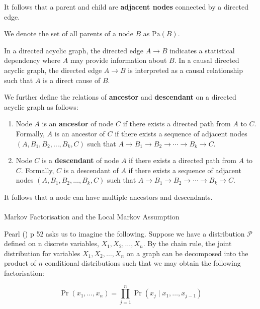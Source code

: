 \documentclass[
  single column]{article}
\makeatletter
\let\oldparagraph\paragraph
\renewcommand{\paragraph}{
    \@ifstar
      \xxxParagraphStar
      \xxxParagraphNoStar
  }
\newcommand{\xxxParagraphStar}[1]{\oldparagraph*{#1}\mbox{}}
\newcommand{\xxxParagraphNoStar}[1]{\oldparagraph{#1}\mbox{}}
\providecommand{\tightlist}{%
  \setlength{\itemsep}{0pt}\setlength{\parskip}{0pt}}\usepackage{longtable,booktabs,array}
\makeatother
\begin{document}
It follows that a parent and child are \textbf{adjacent nodes} connected
by a directed edge.

We denote the set of all parents of a node \(B\) as \(\text{Pa}(B)\).

In a directed acyclic graph, the directed edge \(A \rightarrow B\)
indicates a statistical dependency where \(A\) may provide information
about \(B\). In a causal directed acyclic graph, the directed edge
\(A \rightarrow B\) is interpreted as a causal relationship such that
\(A\) is a direct cause of \(B\).

We further define the relations of \textbf{ancestor} and
\textbf{descendant} on a directed acyclic graph as follows:

\begin{enumerate}
\def\labelenumi{\arabic{enumi}.}
\tightlist
\item
  Node \(A\) is an \textbf{ancestor} of node \(C\) if there exists a
  directed path from \(A\) to \(C\). Formally, \(A\) is an ancestor of
  \(C\) if there exists a sequence of adjacent nodes
  \((A, B_1, B_2, \ldots, B_k, C)\) such that
  \(A \rightarrow B_1 \rightarrow B_2 \rightarrow \cdots \rightarrow B_k \rightarrow C\).
\item
  Node \(C\) is a \textbf{descendant} of node \(A\) if there exists a
  directed path from \(A\) to \(C\). Formally, \(C\) is a descendant of
  \(A\) if there exists a sequence of adjacent nodes
  \((A, B_1, B_2, \ldots, B_k, C)\) such that
  \(A \rightarrow B_1 \rightarrow B_2 \rightarrow \cdots \rightarrow B_k \rightarrow C\).
\end{enumerate}

It follows that a node can have multiple ancestors and descendants.

\paragraph{Markov Factorisation and the Local Markov
Assumption}\label{markov-factorisation-and-the-local-markov-assumption}

Pearl () p 52 asks us to imagine the
following. Suppose we have a distribution \(\mathcal{P}\) defined on n
discrete variables, \(X_1, X_2, \dots, X_n\). By the chain rule, the
joint distribution for variables \(X_1, X_2, \dots, X_n\) on a graph can
be decomposed into the product of \(n\) conditional distributions such
that we may obtain the following factorisation:

\[
\Pr(x_1, \dots, x_n) = \prod_{j=1}^n \Pr(x_j \mid x_1, \dots, x_{j-1})
\]
\end{document}
